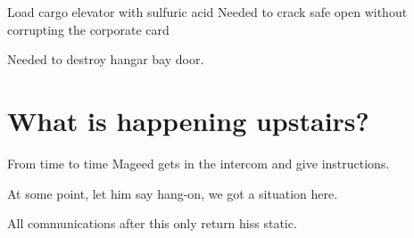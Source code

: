  \begin{rpg-commentbox}{Load cargo elevator with sulfuric acid}
    Needed to crack safe open without corrupting the corporate card

    Needed to destroy hangar bay door.
 \end{rpg-commentbox}

 \newsect

 \section{What is happening upstairs?}
 
 
 \begin{rpg-commentbox}{}
     From time to time Mageed gets in the intercom and give instructions.

     At some point, let him say hang-on, we got a situation here.

     All communications after this only return hiss static.
  \end{rpg-commentbox}